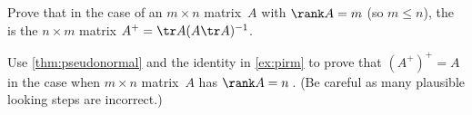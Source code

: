 \begin{exercise} \label{ex:pirm} 
Prove that in the case of an \(m\times n\) matrix~\(A\) with \(\rank A=m\) (so \(m\leq n\)), the  is the \(n\times m\) matrix \(A^+=\tr A(A\tr A)^{-1}\).
\end{exercise}





\begin{exercise}  
Use \cref{thm:pseudonormal} and the identity in \cref{ex:pirm} to prove that \((A^+)^+=A\) in the case when \(m\times n\) matrix~\(A\) has \(\rank A=n\)\,.
(Be careful as many plausible looking steps are incorrect.)
\end{exercise}




\begin{comment}
More exercises of pseudo-inverse could prove conditionally \((cA)^+=(1/c)A^+\), \((A^+)^+=A\), \((\tr A)^+=\tr{(A^+)}\).
More exercises on function composition.
\end{comment}






